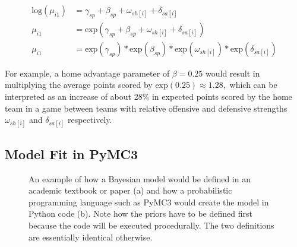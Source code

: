 \begin{equation}
\begin{split}
\text{log}(\mu_{i1}) &= \gamma_{sp} + \beta_{sp} + \omega_{sh[i]} + \delta_{sa[i]} \\
\mu_{i1} &= \text{exp}(\gamma_{sp} + \beta_{sp} + \omega_{sh[i]} + \delta_{sa[i]}) \\
\mu_{i1} &= \text{exp}(\gamma_{sp})*\text{exp}(\beta_{sp})*\text{exp}(\omega_{sh[i]})*\text{exp}(\delta_{sa[i]})
\end{split}
\end{equation}

For example, a home advantage parameter of \(\beta = 0.25\) would result in multiplying the average points scored by \(\text{exp}(0.25) \approx 1.28,\) which can be interpreted as an increase of about 28\% in expected points scored by the home team in a game between teams with relative offensive and defensive strengths \(\omega_{sh[i]}\) and \(\delta_{sa[i]}\) respectively.

\subsection{Model Fit in PyMC3} \label{pymc3}

\begin{figure}
	\caption{An example of how a Bayesian model would be defined in an academic textbook or paper (a) and how a probabilistic programming language such as PyMC3 would create the model in Python code (b). Note how the priors have to be defined first because the code will be executed procedurally. The two definitions are essentially identical otherwise.}
	\label{fig:pymc3_code}
\end{figure}

